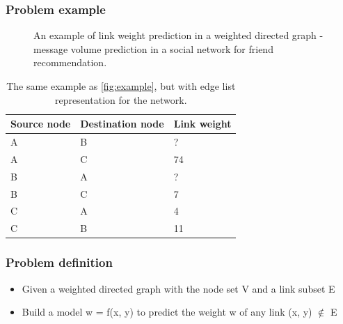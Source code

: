 \documentclass{article}
\begin{document}
\subsubsection{Problem example}
\begin{figure}[H]\centering
	\caption{
		An example of link weight prediction in a weighted directed graph -
		message volume prediction in a social network for friend recommendation.
	}
	\label{fig:example}
\end{figure}
\begin{table}[H]\centering
	\caption{
		The same example as \autoref{fig:example}, but with edge list representation for the network.
	}
	\begin{tabularx}{0.6\textwidth}{|X|X|X|}  \hline \rowcolor{blue!40}
		Source node & Destination node & Link weight \\ \hline
		A & B & ? \\ \hline
		A & C & 74 \\ \hline
		B & A & ? \\ \hline
		B & C & 7 \\ \hline
		C & A & 4 \\ \hline
		C & B & 11 \\ \hline
	\end{tabularx}
	\label{tab:example}
\end{table}

\subsubsection{Problem definition}
\begin{itemize}
	\item Given a weighted directed graph with the node set V and a link subset E
	\item Build a model w = f(x, y) to predict the weight w of any link (x, y) $ \notin $ E
\end{itemize}
\end{document}
